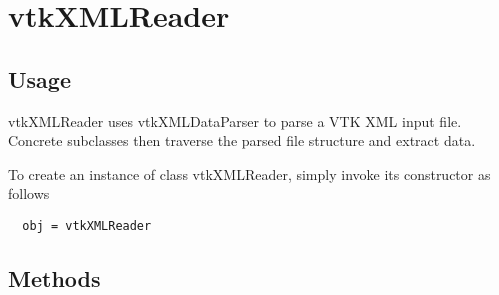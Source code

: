 \section{vtkXMLReader}

\subsection{Usage}

 vtkXMLReader uses vtkXMLDataParser to parse a VTK XML input file.
 Concrete subclasses then traverse the parsed file structure and
 extract data.

To create an instance of class vtkXMLReader, simply
invoke its constructor as follows
\begin{verbatim}
  obj = vtkXMLReader
\end{verbatim}
\subsection{Methods}

